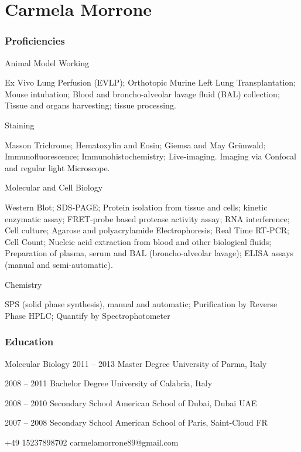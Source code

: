 \documentclass{tccv}
\begin{document}
\part{Carmela Morrone}

\section{Proficiencies}

\begin{eventlist}

\item{Animal Model Working}

	 Ex Vivo Lung Perfusion (EVLP); Orthotopic Murine Left Lung Transplantation;
Mouse intubation;
Blood and broncho-alveolar lavage fluid (BAL) collection;
Tissue and organs harvesting; tissue processing.

\item{Staining}

Masson Trichrome; Hematoxylin and Eosin; Giemsa and May Grünwald;
Immunofluorescence; Immunohistochemistry; Live-imaging. Imaging via Confocal and regular light Microscope.

\item{Molecular and Cell Biology}

Western Blot; SDS-PAGE; Protein isolation from tissue and cells; kinetic enzymatic assay; FRET-probe based protease activity assay;
RNA interference; Cell culture; Agarose and polyacrylamide Electrophoresis;
Real Time RT-PCR; Cell Count; Nucleic acid extraction from blood and other
biological fluids; Preparation of plasma, serum and BAL (broncho-alveolar
lavage); ELISA assays (manual and semi-automatic).

\item{Chemistry}

SPS (solid phase synthesis), manual and automatic; Purification by Reverse
Phase HPLC; Quantify by Spectrophotometer
\end{eventlist}

\section{Education}

\begin{yearlist}

\item[Molecular Biology]{2011 -- 2013}
     {Master Degree}
     {University of Parma, Italy}

\item{2008 -- 2011}
     {Bachelor Degree}
     {University of Calabria, Italy}

\item{2008 -- 2010}
     {Secondary School}
     {American School of Dubai, Dubai UAE}

\item{2007 -- 2008}
     {Secondary School}
     {American School of Paris, Saint-Cloud FR}

\end{yearlist}
\personal
    {+49 15237898702}
    {carmelamorrone89@gmail.com}
\end{document}
